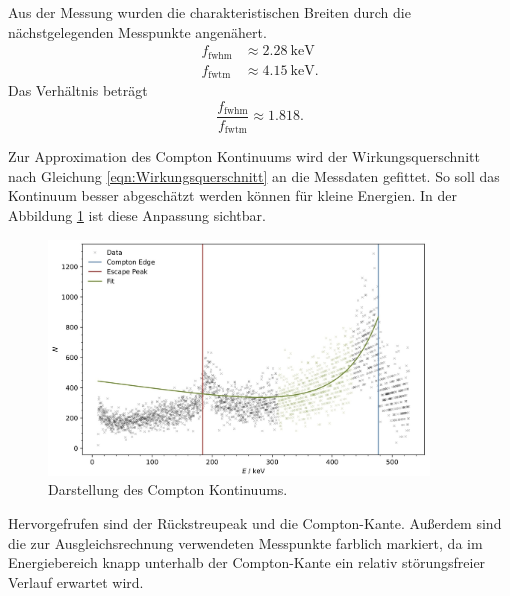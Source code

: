 Aus der Messung wurden die charakteristischen Breiten durch die nächstgelegenden Messpunkte angenähert. 
\begin{align*}
    f_{\text{fwhm}} &\approx \qty{2.28}{\kilo\eV}\\
    f_{\text{fwtm}} &\approx \qty{4.15}{\kilo\eV}.
\end{align*}
Das Verhältnis beträgt
\begin{equation*}
    \frac{f_{\text{fwhm}}}{f_{\text{fwtm}}} \approx \num{1.818}.
\end{equation*}

Zur Approximation des Compton Kontinuums wird der Wirkungsquerschnitt nach Gleichung \ref{eqn:Wirkungsquerschnitt} an die Messdaten gefittet.
So soll das Kontinuum besser abgeschätzt werden können für kleine Energien.
In der Abbildung \ref{fig:plot9} ist diese Anpassung sichtbar.

\begin{figure}[H]
    \centering
    \includegraphics[width=0.9\textwidth]{content/plots/plot9.jpg}
    \caption{Darstellung des Compton Kontinuums.}
    \label{fig:plot9}
\end{figure}

Hervorgefrufen sind der Rückstreupeak und die Compton-Kante. Außerdem sind die zur Ausgleichsrechnung verwendeten Messpunkte farblich
markiert, da im Energiebereich knapp unterhalb der Compton-Kante ein relativ störungsfreier Verlauf erwartet wird.

